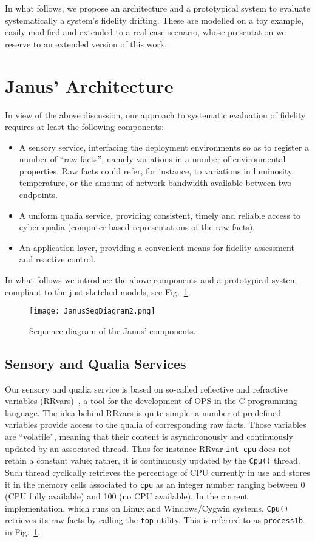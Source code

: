 \documentclass{article}
\begin{document}
In what follows, we propose an architecture and a prototypical system to evaluate systematically a system's fidelity drifting. These are modelled on a toy example, easily modified and extended to a real case scenario, whose presentation we reserve to an extended version of this work.

\section{Janus' Architecture}\label{s:janus}

In view of the above discussion, our approach to systematic evaluation of fidelity requires at least the following
components:

\begin{itemize}
\item A sensory service, interfacing the deployment environments so as to register
a number of ``raw facts'', namely
variations in a number of environmental properties. Raw facts could refer, for instance, to variations
in luminosity, temperature, or the amount of network bandwidth available between two
endpoints.
\item A uniform qualia service, providing consistent, timely and reliable access to 
cyber-qualia (computer-based representations of the raw facts).
\item An application layer, providing a convenient means for fidelity assessment and reactive control.
\end{itemize}
In what follows we introduce the above components and a prototypical system
compliant to the just sketched models, see Fig.~\ref{f:Janus}.



\begin{figure}
\texttt{[image: JanusSeqDiagram2.png]}
\caption{Sequence diagram of the Janus' components.}
\label{f:Janus}
\end{figure}


\subsection{Sensory and Qualia Services}\label{s:janus:rrvars}
Our sensory and qualia service is based on so-called reflective and refractive
variables (RRvars)~\cite{DeBl08a,DB07d}, a tool for the development of OPS in the C
programming language. The idea behind RRvars is quite simple: a number of
predefined variables provide access to the qualia of corresponding raw facts.
Those variables are ``volatile'', meaning that their content is asynchronously
and continuously updated by an associated thread. Thus for instance RRvar \verb"int cpu" does not
retain a constant value; rather, it is continuously updated by the \verb"Cpu()" thread.
Such thread cyclically
retrieves the percentage of CPU currently in use and stores it in the
memory cells associated to \verb"cpu" as an integer number ranging between 0 (CPU fully available)
and 100 (no CPU available). In the current implementation, which runs on 
Linux and Windows/Cygwin systems, \verb"Cpu()" retrieves its raw facts by calling
the \verb"top" utility.
This is referred to as \texttt{process1b} in Fig.~\ref{f:Janus}.
\end{document}
